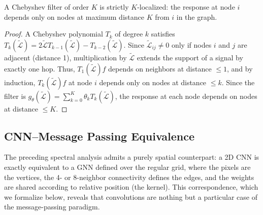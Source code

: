 \begin{theorem}\label{thm:localizacion_chebyshev}
A Chebyshev filter of order $K$ is strictly $K$-localized: the response at node $i$ depends only on nodes at maximum distance $K$ from $i$ in the graph.
\end{theorem}

\begin{proof}
A Chebyshev polynomial $T_k$ of degree $k$ satisfies $T_k(\tilde{\mathcal{L}}) = 2\tilde{\mathcal{L}} T_{k-1}(\tilde{\mathcal{L}}) - T_{k-2}(\tilde{\mathcal{L}})$. Since $\tilde{\mathcal{L}}_{ij} \neq 0$ only if nodes $i$ and $j$ are adjacent (distance 1), multiplication by $\tilde{\mathcal{L}}$ extends the support of a signal by exactly one hop. Thus, $T_1(\tilde{\mathcal{L}})f$ depends on neighbors at distance $\leq 1$, and by induction, $T_k(\tilde{\mathcal{L}})f$ at node $i$ depends only on nodes at distance $\leq k$. Since the filter is $g_\theta(\tilde{\mathcal{L}}) = \sum_{k=0}^K \theta_k T_k(\tilde{\mathcal{L}})$, the response at each node depends on nodes at distance $\leq K$.
\end{proof}

\subsection{CNN--Message Passing Equivalence}\label{subsec:equivalencia_conv_mp}\label{sec:cnn_as_gnn}

The preceding spectral analysis admits a purely spatial counterpart: a 2D \gls{CNN} is exactly equivalent to a \gls{GNN} defined over the regular grid, where the pixels are the vertices, the 4- or 8-neighbor connectivity defines the edges, and the weights are shared according to relative position (the kernel). This correspondence, which we formalize below, reveals that convolutions are nothing but a particular case of the message-passing paradigm.

